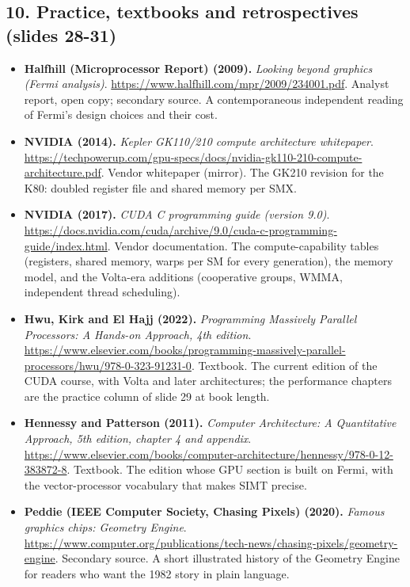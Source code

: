 \documentclass[11pt,letterpaper]{article}
\begin{document}
\subsection*{10. Practice, textbooks and retrospectives (slides 28-31)}
\begin{itemize}[leftmargin=1.2em,itemsep=3pt]\sloppy
\item \textbf{Halfhill (Microprocessor Report) (2009).} \textit{Looking beyond graphics (Fermi analysis)}. \url{https://www.halfhill.com/mpr/2009/234001.pdf}. Analyst report, open copy; secondary source. A contemporaneous independent reading of Fermi's design choices and their cost.
\item \textbf{NVIDIA (2014).} \textit{Kepler GK110/210 compute architecture whitepaper}. \url{https://techpowerup.com/gpu-specs/docs/nvidia-gk110-210-compute-architecture.pdf}. Vendor whitepaper (mirror). The GK210 revision for the K80: doubled register file and shared memory per SMX.
\item \textbf{NVIDIA (2017).} \textit{CUDA C programming guide (version 9.0)}. \url{https://docs.nvidia.com/cuda/archive/9.0/cuda-c-programming-guide/index.html}. Vendor documentation. The compute-capability tables (registers, shared memory, warps per SM for every generation), the memory model, and the Volta-era additions (cooperative groups, WMMA, independent thread scheduling).
\item \textbf{Hwu, Kirk and El Hajj (2022).} \textit{Programming Massively Parallel Processors: A Hands-on Approach, 4th edition}. \url{https://www.elsevier.com/books/programming-massively-parallel-processors/hwu/978-0-323-91231-0}. Textbook. The current edition of the CUDA course, with Volta and later architectures; the performance chapters are the practice column of slide 29 at book length.
\item \textbf{Hennessy and Patterson (2011).} \textit{Computer Architecture: A Quantitative Approach, 5th edition, chapter 4 and appendix}. \url{https://www.elsevier.com/books/computer-architecture/hennessy/978-0-12-383872-8}. Textbook. The edition whose GPU section is built on Fermi, with the vector-processor vocabulary that makes SIMT precise.
\item \textbf{Peddie (IEEE Computer Society, Chasing Pixels) (2020).} \textit{Famous graphics chips: Geometry Engine}. \url{https://www.computer.org/publications/tech-news/chasing-pixels/geometry-engine}. Secondary source. A short illustrated history of the Geometry Engine for readers who want the 1982 story in plain language.
\end{itemize}
\clearpage
\printindex
\end{document}

